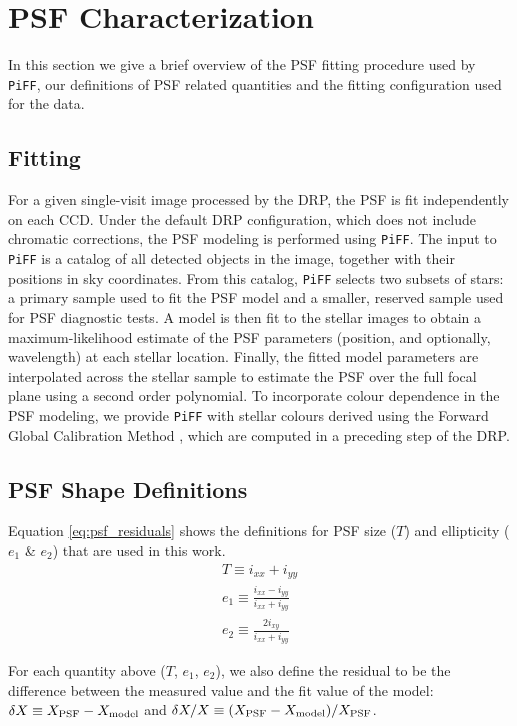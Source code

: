 \section{PSF Characterization}
In this section we give a brief overview of the PSF fitting procedure used by \texttt{PiFF}, our definitions of PSF related quantities and the fitting configuration used for the data.
\subsection{Fitting}
For a given single-visit image processed by the DRP, the PSF is fit independently on each CCD. 
Under the default DRP configuration, which does not include chromatic corrections, the PSF 
modeling is performed using \texttt{PiFF}. The input to \texttt{PiFF} is a catalog of all 
detected objects in the image, together with their positions in sky coordinates. From this 
catalog, \texttt{PiFF} selects two subsets of stars: a primary sample used to fit the PSF 
model and a smaller, reserved sample used for PSF diagnostic tests. A model is then fit to the stellar images to obtain a maximum-likelihood 
estimate of the PSF parameters (position, and optionally, wavelength) at each stellar location. Finally, the fitted model parameters are interpolated across 
the stellar sample to estimate the PSF over the full focal plane using a second order polynomial. To incorporate colour 
dependence in the PSF modeling, we provide \texttt{PiFF} with stellar colours derived using the 
Forward Global Calibration Method \citep[FGCM;][]{burke2017}, which are computed in a preceding 
step of the DRP.

\subsection{PSF Shape Definitions}
Equation \ref{eq:psf_residuals} shows the definitions for PSF size ($T$) and ellipticity ($e_1$ \& $e_2$) that are used in this work.
\begin{equation}
\label{eq:psf_residuals}
    \begin{aligned}
        T \equiv i_{xx} + i_{yy}  \\
        e_1 \equiv \frac{i_{xx}-i_{yy}}{i_{xx}+i_{yy}}\\
        e_2 \equiv \frac{2i_{xy}}{i_{xx}+i_{yy}}
    \end{aligned}
\end{equation}

For each quantity above ($T$, $e_1$, $e_2$), we also define the residual to be the difference between the measured value and the fit value of the model: $\delta X \equiv X_{\rm PSF} - X_{\rm model}$ and $\delta X/X \equiv (X_{\rm PSF}-X_{\rm model})/X_{\rm PSF}$.

